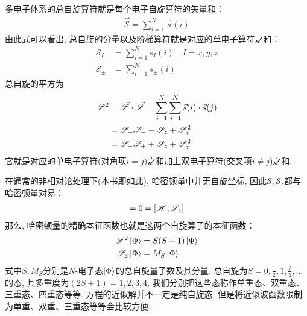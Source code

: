 多电子体系的总自旋算符就是每个电子自旋算符的矢量和：
\newcommand{\ts}{\mathscr{S}}
\begin{align}
\vec{\mathscr{S}} = \sum_{i=1}^{N}\vec{s}(i)
\end{align}
由此式可以看出, 总自旋的分量以及阶梯算符就是对应的单电子算符之和：
\begin{subequations}
	\begin{align}
	\ts_I   & = \sum_{i=1}^{N}s_I(i)\quad I=x,y,z\\
	\ts_\pm & = \sum_{i=1}^{N}s_\pm(i) 
	\end{align}
\end{subequations}
总自旋的平方为
\begin{align}
\ts^2 & = \vec{\ts}\cdot\vec{\ts} = \sum_{i=1}^{N}\sum_{j=1}^{N} \vec{s}(i)\cdot\vec{s}(j) \notag \\
      & = \ts_+\ts_- - \ts_z + \ts^2_z\notag\\
      & = \ts_-\ts_+ + \ts_z + \ts^2_z
\end{align}
它就是对应的单电子算符(对角项$i=j$)之和加上双电子算符(交叉项$i\neq j$)之和.

在通常的非相对论处理下(本书即如此), 哈密顿量中并无自旋坐标, 因此$\ts,\ts_z$都与哈密顿量对易：
\begin{align}
[\hs \ts^2] = 0 = [\hs,\ts_z]
\end{align} 
那么, 哈密顿量的精确本征函数也就是这两个自旋算子的本征函数：
\begin{subequations}
	\begin{align}
	\ts^2\ket{\Phi} & = S(S+1)\ket{\Phi}\\
	\ts_z\ket{\Phi} & = M_S\ket{\Phi}
	\end{align}
\end{subequations}
式中$S,M_S$分别是$N$-电子态$\Ket{\Phi}$的总自旋量子数及其分量. 总自旋为$S=0,\frac{1}{2},1,\frac{3}{2},\ldots$的态, 其多重度为$(2S+1)=1,2,3,4$, 我们分别把这些态称作单重态、双重态、三重态、四重态等等. \sch 方程的近似解并不一定是纯自旋态. 但是将近似波函数限制为单重、双重、三重态等等会比较方便.

